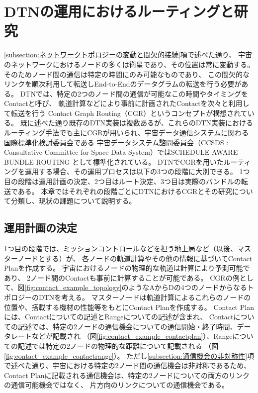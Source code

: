 \chapter{DTNの運用におけるルーティングと研究}
\label{chap:DTNにおけるルーティングの研究と課題}

\ref{subsection:ネットワークトポロジーの変動と間欠的接続}項で述べた通り、
宇宙のネットワークにおけるノードの多くは衛星であり、その位置は常に変動する。
そのためノード間の通信は特定の時間にのみ可能なものであり、
この間欠的なリンクを順次利用して転送しEnd-to-Endのデータグラムの転送を行う必要がある。
DTNでは、特定の2つのノード間の通信が可能なこの時間やタイミングをContactと呼び、
軌道計算などにより事前に計画されたContactを次々と利用して転送を行う
Contact Graph Routing（CGR）\cite{Fraire2021}というコンセプトが構想されている。
既に述べた通り既存のDTN実装は複数あるが、これらのDTN実装における
ルーティング手法でも主にCGRが用いられ、宇宙データ通信システムに関わる国際標準化検討委員会である
宇宙データシステム諮問委員会（CCSDS : Consultative Committee 
for Space Data System）ではSCHEDULE-AWARE BUNDLE ROUTING
\cite{schedule_aware_bundle_routing}として標準化されている。
DTNでCGRを用いたルーティングを運用する場合、その運用プロセスは以下の3つの段階に大別できる。
1つ目の段階は運用計画の決定、2つ目はルート決定、3つ目は実際のバンドルの転送である。
本章ではそれぞれの段階ごとにDTNにおけるCGRとその研究について分類し、現状の課題について説明する。
\section{運用計画の決定}
\label{section:運用計画の決定}
1つ目の段階では、ミッションコントロールなどを担う地上局など（以後、マスターノードとする）が、
各ノードの軌道計算やその他の情報に基づいてContact Planを作成する。
宇宙におけるノードの物理的な軌道は計算により予測可能であり、
2ノード間のContactも事前に計算することが可能である。 
CGRの例として、図\ref{fig:contact_example_topology}のようなAからDの4つのノードからなるトポロジーのDTNを考える。
マスターノードは軌道計算によるこれらのノードの位置や、搭載する機材の性能等をもとにContact Planを作成する。
Contact Planには、Contactについての記述とRangeについての記述が含まれ、
Contactについての記述では、特定の2ノードの通信機会についての通信開始・終了時間、データレートなどが記載され
（図\ref{fig:contact_example_contactplan}）、Rangeについての記述では特定の2ノードの物理的な距離について記載される
（図\ref{fig:contact_example_contactrange}）。
ただし\ref{subsection:通信機会の非対称性}項で述べた通り、宇宙における特定の2ノード間の通信機会は非対称であるため、
Contact Planに記載される通信機会は、特定の2ノードについての両方のリンクの通信可能機会ではなく、
片方向のリンクについての通信機会である。

